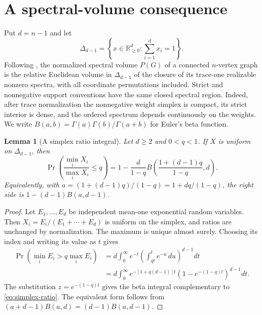 \documentclass[11pt,reqno]{amsart}
\newtheorem{lemma}[theorem]{Lemma}
\theoremstyle{definition}
\theoremstyle{remark}
\newcommand{\R}{\mathbb R}
\begin{document}
\section{A spectral-volume consequence}\label{sec:volume}

Put $d=n-1$ and let
\[
 \Delta_{d-1}=\left\{x\in\R_{\ge0}^d:\sum_{i=1}^d x_i=1\right\}.
\]
Following \cite[Section~8]{EJT2026}, the normalized spectral volume $P(G)$
of a connected $n$-vertex graph is the relative Euclidean volume in
$\Delta_{d-1}$ of the closure of its trace-one realizable nonzero spectra,
with all coordinate permutations included.  Strict and nonnegative support
conventions have the same closed spectral region.  Indeed, after trace
normalization the nonnegative weight simplex is compact, its strict interior
is dense, and the ordered spectrum depends continuously on the weights.
We write $B(a,b)=\Gamma(a)\Gamma(b)/\Gamma(a+b)$ for Euler's beta function.

\begin{lemma}[A simplex ratio integral]\label{lem:simplex-ratio}
Let $d\ge2$ and $0<q<1$.  If $X$ is uniform on $\Delta_{d-1}$, then
\begin{equation}\label{eq:simplex-ratio}
 \Pr\!\left(\frac{\min_iX_i}{\max_iX_i}\le q\right)
 =1-\frac{d}{1-q}
 B\!\left(\frac{1+(d-1)q}{1-q},d\right).
\end{equation}
Equivalently, with
$a=(1+(d-1)q)/(1-q)=1+dq/(1-q)$, the right side is
$1-(d-1)B(a,d-1)$.
\end{lemma}

\begin{proof}
Let $E_1,\ldots,E_d$ be independent mean-one exponential random variables.
Then $X_i=E_i/(E_1+\cdots+E_d)$ is uniform on the simplex, and ratios are
unchanged by normalization.  The maximum is unique almost surely.  Choosing
its index and writing its value as $t$ gives
\begin{align*}
 \Pr(\min_iE_i>q\max_iE_i)
 &=d\int_0^\infty e^{-t}
   \left(\int_{qt}^{t}e^{-u}\,du\right)^{d-1}dt\\
 &=d\int_0^\infty e^{-[1+q(d-1)]t}
   (1-e^{-(1-q)t})^{d-1}dt.
\end{align*}
The substitution $z=e^{-(1-q)t}$ gives the beta integral complementary to
\eqref{eq:simplex-ratio}.  The equivalent form follows from
$(a+d-1)B(a,d)=(d-1)B(a,d-1)$.
\end{proof}
\end{document}
